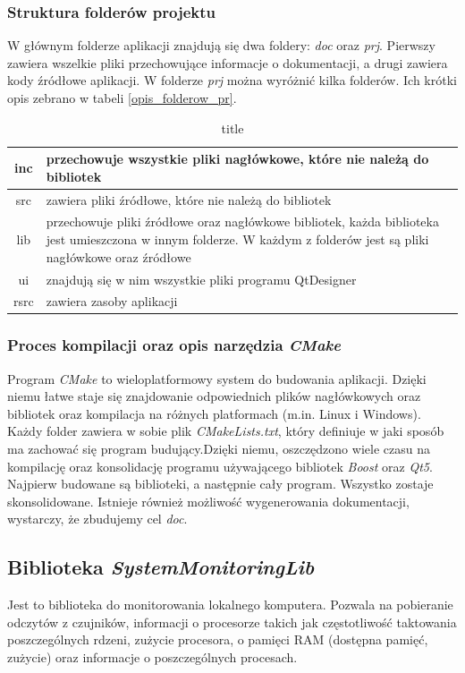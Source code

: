 \documentclass[a4paper]{article}
\begin{document}
\subsubsection{Struktura folderów projektu}
W głównym folderze aplikacji znajdują się dwa foldery: \textit{doc} oraz \textit{prj}. Pierwszy zawiera wszelkie pliki przechowujące informacje o dokumentacji, a drugi zawiera kody źródłowe aplikacji. W folderze \textit{prj} można wyróżnić kilka folderów. Ich krótki opis zebrano w tabeli \ref{opis_folderow_pr}.

\begin{table}
\centering
\begin{tabularx}{0.7\linewidth}{|c|X|}
	\hline
	inc & przechowuje wszystkie pliki nagłówkowe, które nie należą do bibliotek \\ \hline
	src & zawiera pliki źródłowe, które nie należą do bibliotek \\ \hline
	lib & przechowuje pliki źródłowe oraz nagłówkowe bibliotek, każda biblioteka jest umieszczona 
		  w innym folderze. W każdym z folderów jest są pliki nagłówkowe oraz źródłowe \\ \hline
	ui & znajdują się w nim wszystkie pliki  programu QtDesigner \\ \hline
	rsrc  & zawiera zasoby aplikacji \\ \hline
\end{tabularx}

\label{opis_folderow_prj}
\caption{title}
\end{table}

\subsubsection{Proces kompilacji oraz opis narzędzia \textit{CMake}}
Program \textit{CMake} to wieloplatformowy system do budowania aplikacji. Dzięki niemu łatwe staje się
znajdowanie odpowiednich plików nagłówkowych oraz bibliotek oraz kompilacja na różnych platformach (m.in. Linux i Windows). Każdy folder zawiera w sobie plik \textit{CMakeLists.txt}, który definiuje w jaki sposób ma zachować się program budujący.Dzięki niemu, oszczędzono wiele czasu na kompilację oraz konsolidację programu używającego bibliotek \textit{Boost} oraz \textit{Qt5}. Najpierw budowane są biblioteki, a następnie cały program. Wszystko zostaje skonsolidowane. Istnieje również możliwość wygenerowania dokumentacji, wystarczy, że zbudujemy cel \textit{doc}.

\subsection{Biblioteka \textit{SystemMonitoringLib}}
Jest to biblioteka do monitorowania lokalnego komputera. Pozwala na pobieranie odczytów z czujników, informacji o procesorze takich jak częstotliwość taktowania poszczególnych rdzeni, zużycie procesora, o pamięci RAM (dostępna pamięć, zużycie) oraz informacje o poszczególnych procesach. 
\end{document}
